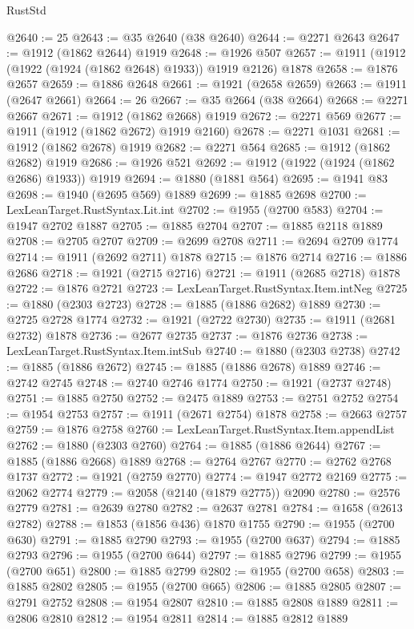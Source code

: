 \begin{lexlean}{RustStd}
\begin{coremodule}
@2640 := 25
@2643 := @35 @2640 (@38 @2640)
@2644 := @2271 @2643
@2647 := @1912 (@1862 @2644) @1919
@2648 := @1926 @507
@2657 := @1911 (@1912 (@1922 (@1924 (@1862 @2648) @1933)) @1919 @2126) @1878
@2658 := @1876 @2657
@2659 := @1886 @2648
@2661 := @1921 (@2658 @2659)
@2663 := @1911 (@2647 @2661)
@2664 := 26
@2667 := @35 @2664 (@38 @2664)
@2668 := @2271 @2667
@2671 := @1912 (@1862 @2668) @1919
@2672 := @2271 @569
@2677 := @1911 (@1912 (@1862 @2672) @1919 @2160)
@2678 := @2271 @1031
@2681 := @1912 (@1862 @2678) @1919
@2682 := @2271 @564
@2685 := @1912 (@1862 @2682) @1919
@2686 := @1926 @521
@2692 := @1912 (@1922 (@1924 (@1862 @2686) @1933)) @1919
@2694 := @1880 (@1881 @564)
@2695 := @1941 @83
@2698 := @1940 (@2695 @569) @1889
@2699 := @1885 @2698
@2700 := LexLeanTarget.RustSyntax.Lit.int
@2702 := @1955 (@2700 @583)
@2704 := @1947 @2702 @1887
@2705 := @1885 @2704
@2707 := @1885 @2118 @1889
@2708 := @2705 @2707
@2709 := @2699 @2708
@2711 := @2694 @2709 @1774
@2714 := @1911 (@2692 @2711) @1878
@2715 := @1876 @2714
@2716 := @1886 @2686
@2718 := @1921 (@2715 @2716)
@2721 := @1911 (@2685 @2718) @1878
@2722 := @1876 @2721
@2723 := LexLeanTarget.RustSyntax.Item.intNeg
@2725 := @1880 (@2303 @2723)
@2728 := @1885 (@1886 @2682) @1889
@2730 := @2725 @2728 @1774
@2732 := @1921 (@2722 @2730)
@2735 := @1911 (@2681 @2732) @1878
@2736 := @2677 @2735
@2737 := @1876 @2736
@2738 := LexLeanTarget.RustSyntax.Item.intSub
@2740 := @1880 (@2303 @2738)
@2742 := @1885 (@1886 @2672)
@2745 := @1885 (@1886 @2678) @1889
@2746 := @2742 @2745
@2748 := @2740 @2746 @1774
@2750 := @1921 (@2737 @2748)
@2751 := @1885 @2750
@2752 := @2475 @1889
@2753 := @2751 @2752
@2754 := @1954 @2753
@2757 := @1911 (@2671 @2754) @1878
@2758 := @2663 @2757
@2759 := @1876 @2758
@2760 := LexLeanTarget.RustSyntax.Item.appendList
@2762 := @1880 (@2303 @2760)
@2764 := @1885 (@1886 @2644)
@2767 := @1885 (@1886 @2668) @1889
@2768 := @2764 @2767
@2770 := @2762 @2768 @1737
@2772 := @1921 (@2759 @2770)
@2774 := @1947 @2772 @2169
@2775 := @2062 @2774
@2779 := @2058 (@2140 (@1879 @2775)) @2090
@2780 := @2576 @2779
@2781 := @2639 @2780
@2782 := @2637 @2781
@2784 := @1658 (@2613 @2782)
@2788 := @1853 (@1856 @436) @1870 @1755
@2790 := @1955 (@2700 @630)
@2791 := @1885 @2790
@2793 := @1955 (@2700 @637)
@2794 := @1885 @2793
@2796 := @1955 (@2700 @644)
@2797 := @1885 @2796
@2799 := @1955 (@2700 @651)
@2800 := @1885 @2799
@2802 := @1955 (@2700 @658)
@2803 := @1885 @2802
@2805 := @1955 (@2700 @665)
@2806 := @1885 @2805
@2807 := @2791 @2752
@2808 := @1954 @2807
@2810 := @1885 @2808 @1889
@2811 := @2806 @2810
@2812 := @1954 @2811
@2814 := @1885 @2812 @1889

\end{coremodule}
\end{lexlean}
